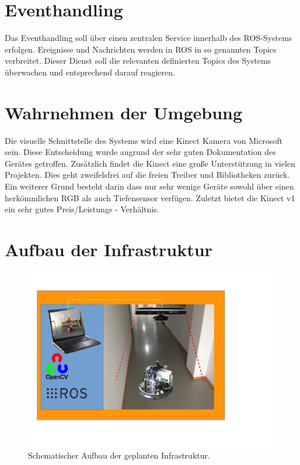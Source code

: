 	\section{Eventhandling}
	Das Eventhandling soll über einen zentralen Service innerhalb des ROS-Systems erfolgen. Ereignisse und Nachrichten werden in ROS in so genannten Topics verbreitet. Dieser Dienst soll die relevanten definierten Topics des Systems überwachen und entsprechend darauf reagieren.

	\section{Wahrnehmen der Umgebung}
	Die visuelle Schnittstelle des Systems wird eine Kinect Kamera von Microsoft sein. Diese Entscheidung wurde augrund der sehr guten Dokumentation des Gerätes getroffen. Zusätzlich findet die Kinect eine große Unterstützung in vielen Projekten. Dies geht zweifelsfrei auf die freien Treiber und Bibliotheken zurück. Ein weiterer Grund besteht darin dass nur sehr wenige Geräte sowohl über einen herkömmlichen RGB als auch Tiefensensor verfügen. Zuletzt bietet die Kinect v1 ein sehr gutes Preis/Leistungs - Verhältnis.
	
	\section{Aufbau der Infrastruktur}
	\begin{figure}[H]
	\centering
	\includegraphics[height=.5\textheight]{../media/infrastruktur}
	\caption{Schematischer Aufbau der geplanten Infrastruktur.}
	\label{fig:infrastruktur}
	\end{figure}
